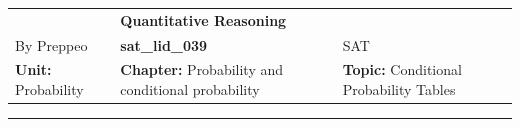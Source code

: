 \documentclass[11pt,paper=a4,answers]{exam}
\begin{document}
\begin{center}
    \centering
    \renewcommand{\arraystretch}{1.5}
    \begin{tabularx}{\textwidth}{YYY}
    & \normalsize\bf{{\Large{{Quantitative Reasoning}}}} & \\
    By Preppeo & \normalsize\bf{{sat\_lid\_039}} & SAT\\
    \normalsize{{\textbf{{Unit:}} Probability}} & \normalsize{{\textbf{{Chapter:}} Probability and conditional probability}} & \normalsize{{\textbf{{Topic:}} Conditional Probability Tables}} \\
    \end{tabularx}
\end{center}
\par\noindent\rule{\textwidth}{1pt}
\end{document}
